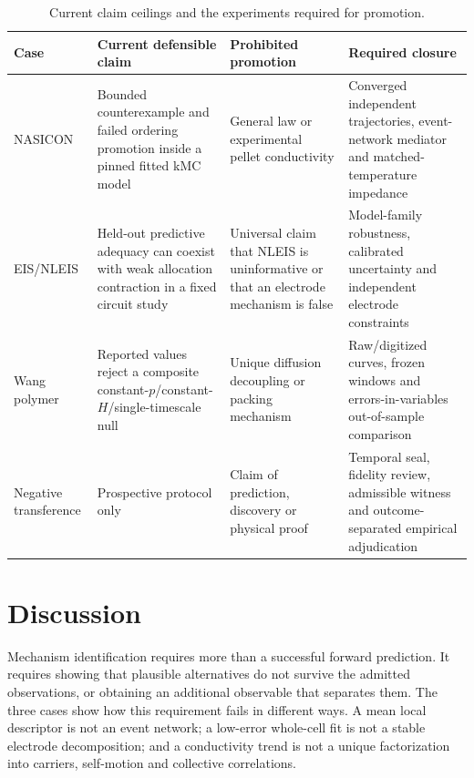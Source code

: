 \documentclass[pdflatex,sn-nature]{sn-jnl}
\newcommand{\kmc}{kMC}
\newcommand{\nleis}{NLEIS}
\begin{document}
\begin{table}[t]
\caption{Current claim ceilings and the experiments required for promotion.}\label{tab:roadmap}
\centering
\small
\begin{tabular}{>{\raggedright\arraybackslash}p{}>{\raggedright\arraybackslash}p{}>{\raggedright\arraybackslash}p{}>{\raggedright\arraybackslash}p{}}
\toprule
Case & Current defensible claim & Prohibited promotion & Required closure \\
\midrule
NASICON & Bounded counterexample and failed ordering promotion inside a pinned fitted \kmc{} model & General law or experimental pellet conductivity & Converged independent trajectories, event-network mediator and matched-temperature impedance \\
EIS/\nleis{} & Held-out predictive adequacy can coexist with weak allocation contraction in a fixed circuit study & Universal claim that \nleis{} is uninformative or that an electrode mechanism is false & Model-family robustness, calibrated uncertainty and independent electrode constraints \\
Wang polymer & Reported values reject a composite constant-$p$/constant-$H$/single-timescale null & Unique diffusion decoupling or packing mechanism & Raw/digitized curves, frozen windows and errors-in-variables out-of-sample comparison \\
Negative transference & Prospective protocol only & Claim of prediction, discovery or physical proof & Temporal seal, fidelity review, admissible witness and outcome-separated empirical adjudication \\
\bottomrule
\end{tabular}
\end{table}

\section{Discussion}

Mechanism identification requires more than a successful forward prediction. It requires showing that plausible alternatives do not survive the admitted observations, or obtaining an additional observable that separates them. The three cases show how this requirement fails in different ways. A mean local descriptor is not an event network; a low-error whole-cell fit is not a stable electrode decomposition; and a conductivity trend is not a unique factorization into carriers, self-motion and collective correlations.
\end{document}
